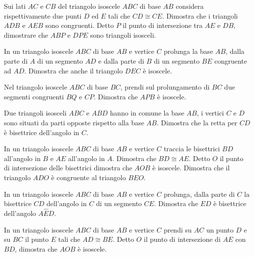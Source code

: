 \begin{multicols}{2}
\begin{esercizio}
\label{ese:2.37}
Sui lati \(AC\) e \(CB\) del triangolo isoscele \(ABC\) di base \(AB\) 
considera rispettivamente due punti \(D\) ed \(E\) tali che \(CD\cong CE\). 
Dimostra che i triangoli \(ADB\) e \(AEB\) sono congruenti. Detto \(P\) il 
punto di intersezione tra \(AE\) e \(DB\), dimostrare che \(ABP\) e \(DPE\) 
sono triangoli isosceli.
\end{esercizio}

\begin{esercizio}
\label{ese:2.38}
In un triangolo isoscele \(ABC\) di base \(AB\) e vertice \(C\) prolunga la 
base \(AB\), dalla parte di \(A\) di un segmento \(AD\) e dalla parte di 
\(B\) di un segmento \(BE\) congruente ad \(AD\). Dimostra che anche il 
triangolo \(DEC\) è isoscele.
\end{esercizio}

\begin{esercizio}
\label{ese:2.39}
Nel triangolo isoscele \(ABC\) di base \(BC\), prendi sul prolungamento 
di \(BC\) due segmenti congruenti \(BQ\) e \(CP\). Dimostra che \(APB\) è 
isoscele.
\end{esercizio}

\begin{esercizio}
\label{ese:2.40}
Due triangoli isosceli \(ABC\) e \(ABD\) hanno in comune la base \(AB\), i 
vertici \(C\) e \(D\) sono situati da parti opposte rispetto alla base 
\(AB\). Dimostra che la retta per \(CD\) è bisettrice dell'angolo in \(C\).
\end{esercizio}

\begin{esercizio}
\label{ese:2.41}
In un triangolo isoscele \(ABC\) di base \(AB\) e vertice \(C\) traccia le 
bisettrici \(BD\) all'angolo in \(B\) e \(AE\) all'angolo in \(A\). Dimostra 
che \(BD\cong AE\). Detto \(O\) il punto di intersezione delle bisettrici 
dimostra che \(AOB\) è isoscele. Dimostra che il triangolo \(ADO\) è 
congruente al triangolo \(BEO\).
\end{esercizio}

\begin{esercizio}
\label{ese:2.42}
In un triangolo isoscele \(ABC\) di base \(AB\) e vertice \(C\) prolunga, 
dalla parte di \(C\) la bisettrice \(CD\) dell'angolo in \(C\) di un 
segmento \(CE\). Dimostra che \(ED\) è bisettrice dell'angolo 
\(A\widehat{E}D\).
\end{esercizio}

\begin{esercizio}
\label{ese:2.43}
In un triangolo isoscele \(ABC\) di base \(AB\) e vertice \(C\) prendi su 
\(AC\) un punto \(D\) e su \(BC\) il punto \(E\) tali che \(AD\cong BE\). Detto 
\(O\) il punto di intersezione di \(AE\) con \(BD\), dimostra che \(AOB\) è 
isoscele.
\end{esercizio}


\end{multicols}
